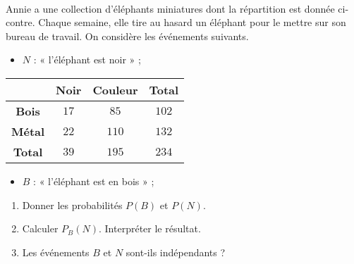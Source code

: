 \documentclass[11pt]{article}
\begin{document}
\begin{exo}[$3,5$ points]~\\
\begin{minipage}{.55\textwidth}
  Annie a une collection d'éléphants miniatures dont la répartition est donnée
  ci-contre. Chaque semaine, elle tire au hasard un éléphant pour le mettre sur
  son bureau de travail. On considère les événements suivants.
  \begin{itemize}
    \item $N$ : « l'éléphant est noir » ;
  \end{itemize}
  \end{minipage}
\begin{minipage}{.45\textwidth}
  \begin{center}
 \begin{tabular}{cccc}
  \toprule
  & \textbf{Noir} & \textbf{Couleur} & \textbf{Total} \\
  \midrule
  \textbf{Bois} & $17$ & $85$ & $102$ \\
  \textbf{Métal} & $22$ & $110$ & $132$ \\
  \textbf{Total} & $39$ & $195$ & $234$ \\
  \bottomrule
\end{tabular}
  \end{center}
\end{minipage}
  \begin{itemize}
    \item $B$ : « l'éléphant est en bois » ;
  \end{itemize}
  \begin{enumerate}
    \item Donner les probabilités $P(B)$ et $P(N)$.
    \item Calculer $P_B(N)$. Interpréter le résultat.
    \item Les événements $B$ et $N$ sont-ils indépendants ?
  \end{enumerate}
\end{exo}
\end{document}
